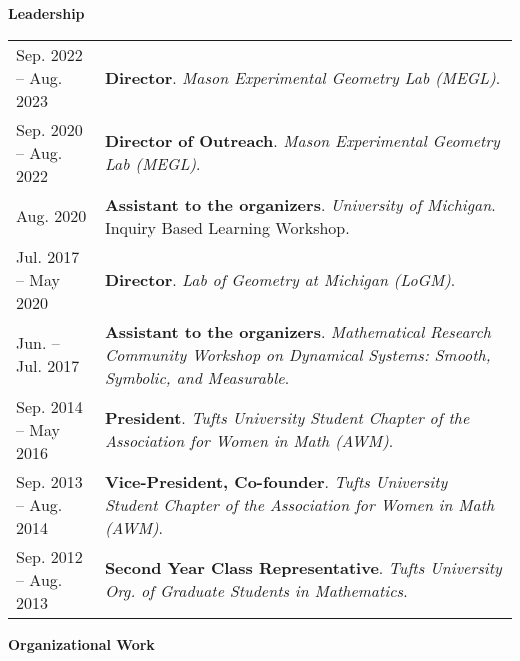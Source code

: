 
    \medskip


    \medskip
    \medskip



    \textbf{\large Leadership}
    
    \begin{center}
    {
    \renewcommand{\arraystretch}{1.2}
    \begin{longtable}{p{}  p{}}
     Sep.  2022 --  Aug.  2023 & \textbf{Director}. \textit{Mason Experimental Geometry Lab (MEGL)}.  \\ 
 Sep.  2020 --  Aug.  2022 & \textbf{Director of Outreach}. \textit{Mason Experimental Geometry Lab (MEGL)}.  \\ 
 Aug.  2020 & \textbf{Assistant to the organizers}. \textit{University of Michigan}.  Inquiry Based Learning Workshop.  \\ 
 Jul.  2017 --  May  2020 & \textbf{Director}. \textit{Lab of Geometry at Michigan (LoGM)}.  \\ 
 Jun.  --  Jul.  2017 & \textbf{Assistant to the organizers}. \textit{Mathematical Research Community Workshop on Dynamical Systems: Smooth, Symbolic, and Measurable}.  \\ 
 Sep.  2014 --  May  2016 & \textbf{President}. \textit{Tufts University Student Chapter of the Association for Women in Math (AWM)}.  \\ 
 Sep.  2013 --  Aug.  2014 & \textbf{Vice-President, Co-founder}. \textit{Tufts University Student Chapter of the Association for Women in Math (AWM)}.  \\ 
 Sep.  2012 --  Aug.  2013 & \textbf{Second Year Class Representative}. \textit{Tufts University Org. of Graduate Students in Mathematics}.  
    \end{longtable}
    } 
    \end{center}

    \vspace{-1em}
    

    \textbf{\large Organizational Work}
    
